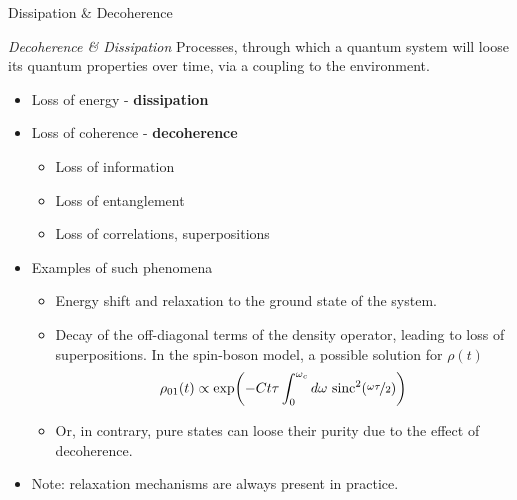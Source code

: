 \documentclass[10pt,xcolor={table,dvipsnames},t]{beamer}
\begin{document}
\begin{frame}{Dissipation \& Decoherence}
  \begin{block}{\textit{Decoherence \& Dissipation}}
     Processes, through which a quantum system will loose its quantum properties over time, via a coupling to the environment.
  \end{block}
\begin{itemize}
    \begin{itemize}
      \item<2-> Loss of energy - \textbf{dissipation}
      \item<3-> Loss of coherence - \textbf{decoherence}
        \begin{itemize}
          \item<3-> Loss of information 
          \item<3-> Loss of entanglement
          \item<3-> Loss of correlations, superpositions
        \end{itemize}
      \item<4-> Examples of such phenomena
        \begin{itemize}
          \item<4-> Energy shift and relaxation to the ground state of the system.
          \item<5-> Decay of the off-diagonal terms of the density operator, leading to loss of superpositions.
            In the spin-boson model, a possible solution for $\rho(t)$
            $$\rho_{01}(t)\propto \exp\biggl( -Ct\tau \int_0^{\omega_c} d\omega \text{ sinc}^2(\nicefrac{\omega \tau}{2}) \biggr)$$
          \item<5-> Or, in contrary, pure states can loose their purity due to the effect of decoherence.
        \end{itemize}
        \item<6-> Note: relaxation mechanisms are always present in practice.
    \end{itemize}
\end{itemize}
\end{frame}
\end{document}
